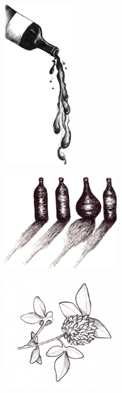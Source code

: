 $  $%
%

\begin{figure}[!b]
\begin{center}
\includegraphics[width=3cm]{../bilder/vinet.jpg} 
\end{center}
\end{figure}
\clearpage

\clearpage

\clearpage

\begin{figure}[!b]
\begin{center}
\includegraphics[width=5cm]{../bilder/flaskor.jpg} 
\end{center}
\end{figure}
\clearpage

\begin{figure}[!b]
\begin{center}
\includegraphics[width=5cm]{../bilder/klover.jpg} 
\end{center}
\end{figure}
